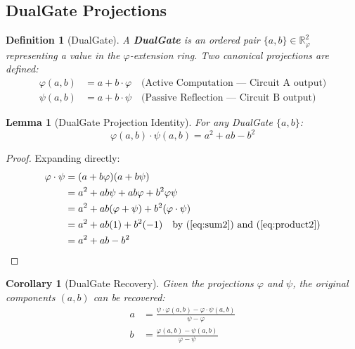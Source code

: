 \documentclass[11pt,a4paper]{article}
\newtheorem{lemma}[theorem]{Lemma}
\newtheorem{definition}[theorem]{Definition}
\newtheorem{corollary}[theorem]{Corollary}
\begin{document}
\subsection{DualGate Projections}

\begin{definition}[DualGate]
A \textbf{DualGate} is an ordered pair $\{a, b\} \in \mathbb{R}_\varphi^2$ representing a value in the $\varphi$-extension ring. Two canonical projections are defined:
\begin{align}
\varphi(a,b) &= a + b \cdot \varphi \quad \text{(Active Computation — Circuit A output)} \label{eq:phiproj} \\
\psi(a,b) &= a + b \cdot \psi \quad \text{(Passive Reflection — Circuit B output)} \label{eq:psiproj}
\end{align}
\end{definition}

\begin{lemma}[DualGate Projection Identity]\label{lem:dualgate}
For any DualGate $\{a, b\}$:
\begin{equation}
\varphi(a,b) \cdot \psi(a,b) = a^2 + ab - b^2 \label{eq:dualgateprod}
\end{equation}
\end{lemma}

\begin{proof}
Expanding directly:
\begin{align*}
\varphi \cdot \psi &= (a + b\varphi)(a + b\psi) \\
&= a^2 + ab\psi + ab\varphi + b^2\varphi\psi \\
&= a^2 + ab(\varphi + \psi) + b^2(\varphi \cdot \psi) \\
&= a^2 + ab(1) + b^2(-1) \quad \text{by (\ref{eq:sum2}) and (\ref{eq:product2})} \\
&= a^2 + ab - b^2
\end{align*}
\end{proof}

\begin{corollary}[DualGate Recovery]
Given the projections $\varphi$ and $\psi$, the original components $(a,b)$ can be recovered:
\begin{align}
a &= \frac{\psi \cdot \varphi(a,b) - \varphi \cdot \psi(a,b)}{\psi - \varphi} \label{eq:recovera} \\
b &= \frac{\varphi(a,b) - \psi(a,b)}{\varphi - \psi} \label{eq:recoverb}
\end{align}
\end{corollary}
\end{document}
